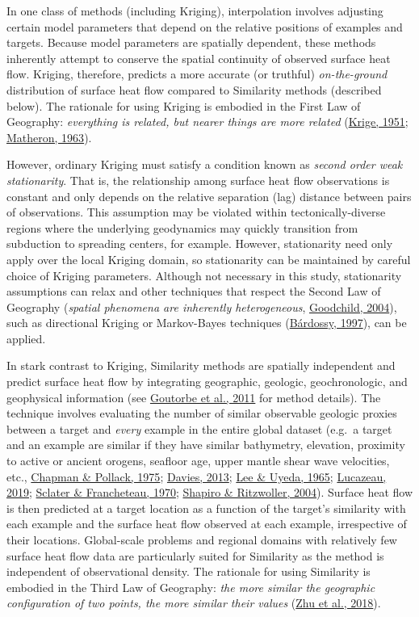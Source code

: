 In one class of methods (including Kriging), interpolation involves adjusting certain model parameters that depend on the relative positions of examples and targets. Because model parameters are spatially dependent, these methods inherently attempt to conserve the spatial continuity of observed surface heat flow. Kriging, therefore, predicts a more accurate (or truthful) \emph{on-the-ground} distribution of surface heat flow compared to Similarity methods (described below). The rationale for using Kriging is embodied in the First Law of Geography: \emph{everything is related, but nearer things are more related} (\protect\hyperlink{ref-krige1951}{Krige, 1951}; \protect\hyperlink{ref-matheron1963}{Matheron, 1963}).

However, ordinary Kriging must satisfy a condition known as \emph{second order weak stationarity}. That is, the relationship among surface heat flow observations is constant and only depends on the relative separation (lag) distance between pairs of observations. This assumption may be violated within tectonically-diverse regions where the underlying geodynamics may quickly transition from subduction to spreading centers, for example. However, stationarity need only apply over the local Kriging domain, so stationarity can be maintained by careful choice of Kriging parameters. Although not necessary in this study, stationarity assumptions can relax and other techniques that respect the Second Law of Geography (\emph{spatial phenomena are inherently heterogeneous}, \protect\hyperlink{ref-goodchild2004}{Goodchild, 2004}), such as directional Kriging or Markov-Bayes techniques (\protect\hyperlink{ref-bardossy1997}{Bárdossy, 1997}), can be applied.

In stark contrast to Kriging, Similarity methods are spatially independent and predict surface heat flow by integrating geographic, geologic, geochronologic, and geophysical information (see \protect\hyperlink{ref-goutorbe2011}{Goutorbe et al., 2011} for method details). The technique involves evaluating the number of similar observable geologic proxies between a target and \emph{every} example in the entire global dataset (e.g.~a target and an example are similar if they have similar bathymetry, elevation, proximity to active or ancient orogens, seafloor age, upper mantle shear wave velocities, etc., \protect\hyperlink{ref-chapman1975}{Chapman \& Pollack, 1975}; \protect\hyperlink{ref-davies2013}{Davies, 2013}; \protect\hyperlink{ref-lee1965}{Lee \& Uyeda, 1965}; \protect\hyperlink{ref-lucazeau2019}{Lucazeau, 2019}; \protect\hyperlink{ref-sclater1970}{Sclater \& Francheteau, 1970}; \protect\hyperlink{ref-shapiro2004}{Shapiro \& Ritzwoller, 2004}). Surface heat flow is then predicted at a target location as a function of the target's similarity with each example and the surface heat flow observed at each example, irrespective of their locations. Global-scale problems and regional domains with relatively few surface heat flow data are particularly suited for Similarity as the method is independent of observational density. The rationale for using Similarity is embodied in the Third Law of Geography: \emph{the more similar the geographic configuration of two points, the more similar their values} (\protect\hyperlink{ref-zhu2018}{Zhu et al., 2018}).

